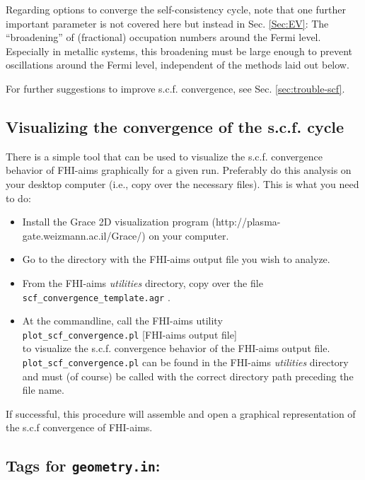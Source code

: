 Regarding options to converge the self-consistency cycle, note that
one further important parameter is not covered here but instead in
Sec. \ref{Sec:EV}: The ``broadening'' of (fractional) occupation numbers
around the Fermi level. Especially in metallic systems, this
broadening must be large enough to prevent oscillations around the
Fermi level, independent of the methods laid out below.

For further suggestions to improve s.c.f. convergence, see Sec. \ref{sec:trouble-scf}.

\subsection{Visualizing the convergence of the s.c.f. cycle}
\label{sub:vis-scf}

There is a simple tool that can be used to visualize the s.c.f. convergence
behavior of FHI-aims graphically for a given run. Preferably do this
analysis on your desktop computer (i.e., copy over the necessary
files). This is what you need to do:
\begin{itemize}
  \item Install the Grace 2D visualization program
    (http://plasma-gate.weizmann.ac.il/Grace/) on your computer.
  \item Go to the directory with the FHI-aims output file you wish to analyze.
  \item From the FHI-aims \emph{utilities} directory, copy over the
    file \texttt{scf\_convergence\_template.agr} .
  \item At the commandline, call the FHI-aims utility \\
    \texttt{plot\_scf\_convergence.pl} [FHI-aims output file] \\
    to visualize the s.c.f. convergence behavior of the FHI-aims
    output file. \texttt{plot\_scf\_convergence.pl} can be found in
    the FHI-aims \emph{utilities} directory and must (of course) be
    called with the correct directory path preceding the file name.
\end{itemize}
If successful, this procedure will assemble and open a graphical
representation of the s.c.f convergence of FHI-aims.

\newpage

\subsection*{Tags for \texttt{geometry.in}:}


